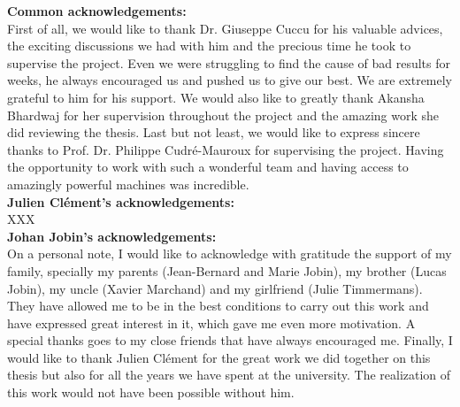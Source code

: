 
\textbf{Common acknowledgements:}\\
First of all, we would like to thank Dr. Giuseppe Cuccu for his valuable advices, the exciting discussions we had with him and the precious time he took to supervise the project. Even we were struggling to find the cause of bad results for weeks, he always encouraged us and pushed us to give our best. We are extremely grateful to him for his support. We would also like to greatly thank Akansha Bhardwaj for her supervision throughout the project and the amazing work she did reviewing the thesis. Last but not least, we would like to express sincere thanks to Prof. Dr. Philippe Cudré-Mauroux for supervising the project. Having the opportunity to work with such a wonderful team and having access to amazingly powerful machines was incredible.\\

\noindent \textbf{Julien Clément's acknowledgements:}\\
XXX\\

\noindent \textbf{Johan Jobin's acknowledgements:}\\
On a personal note, I would like to acknowledge with gratitude the support of my family, specially my parents (Jean-Bernard and Marie Jobin), my brother (Lucas Jobin), my uncle (Xavier Marchand) and my girlfriend (Julie Timmermans). They have allowed me to be in the best conditions to carry out this work and have expressed great interest in it, which gave me even more motivation. A special thanks goes to my close friends that have always encouraged me. Finally, I would like to thank Julien Clément for the great work we did together on this thesis but also for all the years we have spent at the university. The realization of this work would not have been possible without him.